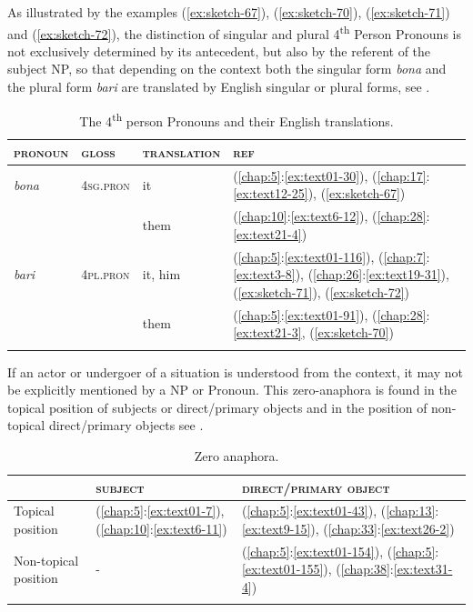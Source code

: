 \documentclass[output=paper]{langscibook}
\begin{document}
As illustrated by the examples (\ref{ex:sketch-67}), (\ref{ex:sketch-70}), (\ref{ex:sketch-71}) and (\ref{ex:sketch-72}), the distinction of singular and plural 4\textsuperscript{th} Person Pronouns is not exclusively determined by its antecedent, but also by the referent of the subject NP, so that depending on the context both the singular form \textit{bona} and the plural form \textit{bari} are translated by English singular or plural forms, see .


\begin{table}
    \caption{The 4\textsuperscript{th} person Pronouns and their English translations.} \label{tab:fourthperson}
\begin{tabularx}{\textwidth}{XXXl}
    \lsptoprule
    \textsc{pronoun}&\textsc{gloss}&\textsc{translation}&\textsc{ref}\\
    \midrule
        \textit{bona}&4\textsc{sg}.\textsc{pron}&it&(\ref{chap:5}:\ref{ex:text01-30}), (\ref{chap:17}:\ref{ex:text12-25}), (\ref{ex:sketch-67})\\
        &&them&(\ref{chap:10}:\ref{ex:text6-12}), (\ref{chap:28}:\ref{ex:text21-4})\\
        \textit{bari}&4\textsc{pl}.\textsc{pron}&it, him&(\ref{chap:5}:\ref{ex:text01-116}), (\ref{chap:7}:\ref{ex:text3-8}), (\ref{chap:26}:\ref{ex:text19-31}), (\ref{ex:sketch-71}), (\ref{ex:sketch-72})\\
        &&them&(\ref{chap:5}:\ref{ex:text01-91}), (\ref{chap:28}:\ref{ex:text21-3}, (\ref{ex:sketch-70})\\
    \lspbottomrule
\end{tabularx}
\end{table}


If an actor or undergoer of a situation is understood from the context, it may not be explicitly mentioned by a NP or Pronoun. This zero-anaphora is found in the topical position of subjects or direct/primary objects and in the position of non-topical direct/primary objects see .


\begin{table}
    \caption{Zero anaphora.} \label{tab:zero}
\begin{tabularx}{\textwidth}{XXl}
    \lsptoprule
    &\textsc{subject}&\textsc{direct/primary object}\\
    \midrule
        Topical position&(\ref{chap:5}:\ref{ex:text01-7}), (\ref{chap:10}:\ref{ex:text6-11})&(\ref{chap:5}:\ref{ex:text01-43}), (\ref{chap:13}:\ref{ex:text9-15}), (\ref{chap:33}:\ref{ex:text26-2})\\
        Non-topical position&-&(\ref{chap:5}:\ref{ex:text01-154}), (\ref{chap:5}:\ref{ex:text01-155}), (\ref{chap:38}:\ref{ex:text31-4})\\
    \lspbottomrule
\end{tabularx}
\end{table}
\end{document}

